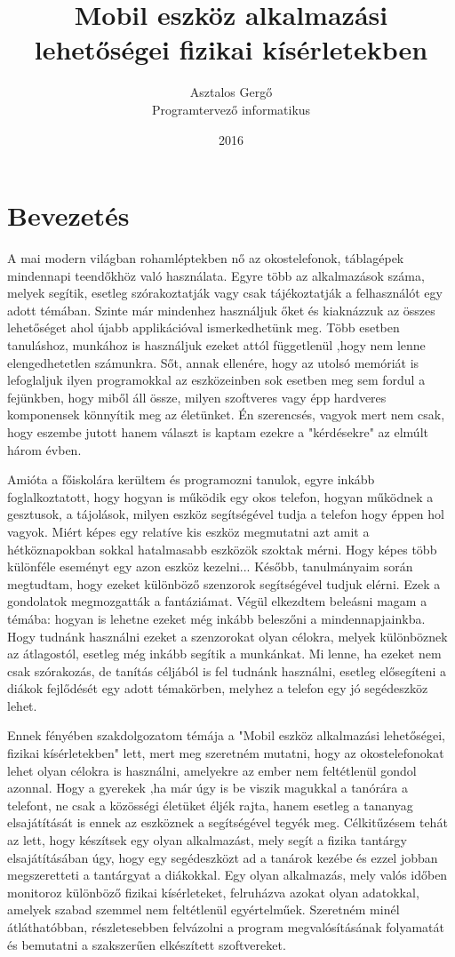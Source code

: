 \documentclass{thesis-ekf}
\institute{Eszterházy Károly Főiskola\\ Matematikai és Informatikai Intézet}
\title{Mobil eszköz alkalmazási lehetőségei fizikai kísérletekben}
\author{Asztalos Gergő\\ Programtervező informatikus}
\date{2016}
\theoremstyle{definition}
\theoremstyle{remark}
\begin{document}
\maketitle
\tableofcontents

\chapter*{Bevezetés}
A mai modern világban rohamléptekben nő az okostelefonok, táblagépek mindennapi teendőkhöz való használata. Egyre több az alkalmazások száma, melyek segítik, esetleg szórakoztatják vagy csak tájékoztatják a felhasználót egy adott témában. 
Szinte már mindenhez használjuk őket és kiaknázzuk az összes lehetőséget ahol újabb applikációval ismerkedhetünk meg.
Több esetben tanuláshoz, munkához is használjuk ezeket attól függetlenül ,hogy nem lenne elengedhetetlen számunkra.
Sőt, annak ellenére, hogy az utolsó memóriát is lefoglaljuk ilyen programokkal az eszközeinben sok esetben meg sem fordul a fejünkben, hogy miből áll össze, milyen szoftveres vagy épp hardveres komponensek könnyítik meg az életünket. Én szerencsés, vagyok mert nem csak, hogy eszembe jutott hanem választ is kaptam ezekre a "kérdésekre" az elmúlt három évben.
\par Amióta a főiskolára kerültem és programozni tanulok, egyre inkább foglalkoztatott, hogy hogyan is működik egy okos telefon, hogyan működnek a gesztusok, a tájolások, milyen eszköz segítségével tudja a telefon hogy éppen hol vagyok. Miért képes egy relatíve kis eszköz megmutatni azt amit a hétköznapokban sokkal hatalmasabb eszközök szoktak mérni. Hogy képes több különféle eseményt egy azon eszköz kezelni...
Később, tanulmányaim során megtudtam, hogy ezeket különböző szenzorok segítségével tudjuk elérni. 
Ezek a gondolatok megmozgatták a fantáziámat. Végül elkezdtem beleásni magam a témába: hogyan is lehetne ezeket még inkább beleszőni a mindennapjainkba. Hogy tudnánk használni ezeket a szenzorokat olyan célokra, melyek különböznek az átlagostól, esetleg még inkább segítik a munkánkat. Mi lenne, ha ezeket nem csak szórakozás, de tanítás céljából is fel tudnánk használni, esetleg elősegíteni a diákok fejlődését egy adott témakörben, melyhez a telefon egy jó segédeszköz lehet.
\par Ennek fényében szakdolgozatom témája a "Mobil eszköz alkalmazási lehetőségei, fizikai kísérletekben" lett, mert meg szeretném mutatni, hogy az okostelefonokat lehet olyan célokra is használni, amelyekre az ember nem feltétlenül gondol azonnal. Hogy a gyerekek ,ha már úgy is be viszik magukkal a tanórára a telefont, ne csak a közösségi életüket éljék rajta, hanem esetleg a tananyag elsajátítását is ennek az eszköznek a segítségével tegyék meg. Célkitűzésem tehát az lett, hogy készítsek egy olyan alkalmazást, mely segít a fizika tantárgy elsajátításában úgy, hogy egy segédeszközt ad a tanárok kezébe és ezzel jobban megszeretteti a tantárgyat a diákokkal. Egy olyan alkalmazás, mely valós időben monitoroz különböző fizikai kísérleteket, felruházva azokat olyan adatokkal, amelyek szabad szemmel nem feltétlenül egyértelműek. Szeretném minél átláthatóbban, részletesebben felvázolni a program megvalósításának folyamatát és bemutatni a szakszerűen elkészített szoftvereket.
\end{document}
